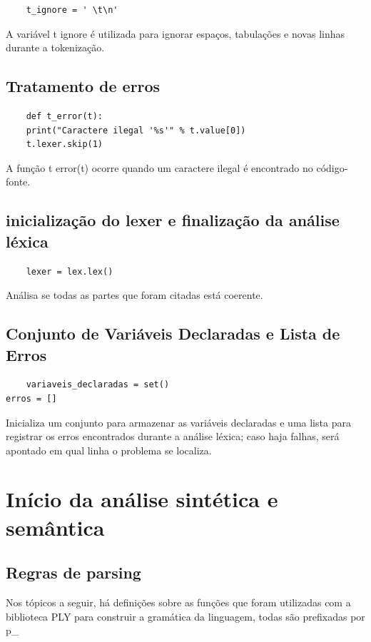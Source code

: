 \documentclass[a4paper,12pt]{article}
\begin{document}
\begin{verbatim}
    t_ignore = ' \t\n'
\end{verbatim}

A variável t ignore é utilizada para ignorar espaços, tabulações e novas 
linhas durante a tokenização.

\subsection{Tratamento de erros}
\begin{verbatim}
    def t_error(t):
    print("Caractere ilegal '%s'" % t.value[0])
    t.lexer.skip(1)

\end{verbatim}
A função t error(t) ocorre quando um caractere ilegal é encontrado no 
código-fonte.

\subsection{inicialização do lexer e finalização da análise léxica}
\begin{verbatim}
    lexer = lex.lex()
\end{verbatim}
Análisa se todas as partes que foram citadas está coerente.

\subsection{Conjunto de Variáveis Declaradas e Lista de Erros}
\begin{verbatim}
    variaveis_declaradas = set()
erros = []
\end{verbatim}
Inicializa um conjunto para armazenar as variáveis declaradas e uma 
lista para registrar os erros encontrados durante a análise léxica; caso 
haja falhas, será apontado em qual linha o problema se localiza.

\section{Início da análise sintética e semântica}

\subsection{Regras de parsing}
Nos tópicos a seguir, há definições sobre as funções que foram 
utilizadas com a biblioteca PLY para construir a gramática da linguagem, 
todas são prefixadas por p\_
\end{document}
